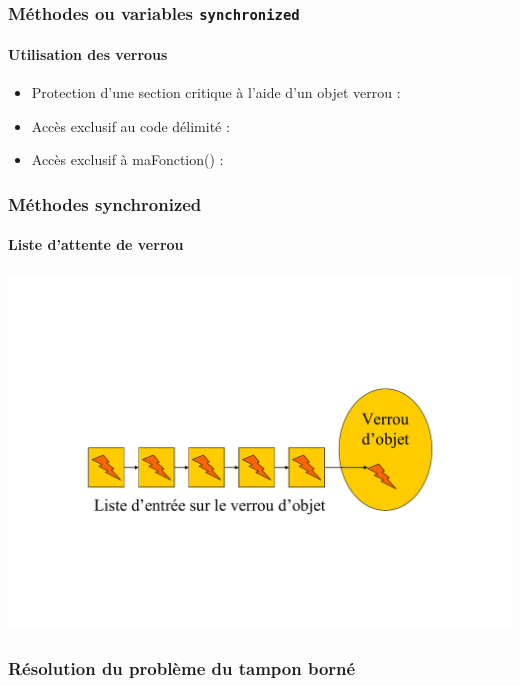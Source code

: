 \begin{frame}
\frametitle{Méthodes ou variables \texttt{synchronized}}
\framesubtitle{Utilisation des verrous}
\begin{itemize}
\item Protection d'une section critique à l'aide d'un objet verrou :
\begin{scriptsize}\end{scriptsize}
\item Accès exclusif au code délimité :
\begin{scriptsize}\end{scriptsize}
\item Accès exclusif à maFonction() :
\begin{scriptsize}\end{scriptsize}
\end{itemize}
\end{frame}

\begin{frame}
\frametitle{Méthodes synchronized}
\framesubtitle{Liste d'attente de verrou}
\includegraphics[width=\textwidth]{../illustration/methode_synchronized.pdf}
\end{frame}

\begin{frame}
\frametitle{Résolution du problème du tampon borné}
\begin{scriptsize}\end{scriptsize}
\end{frame}

